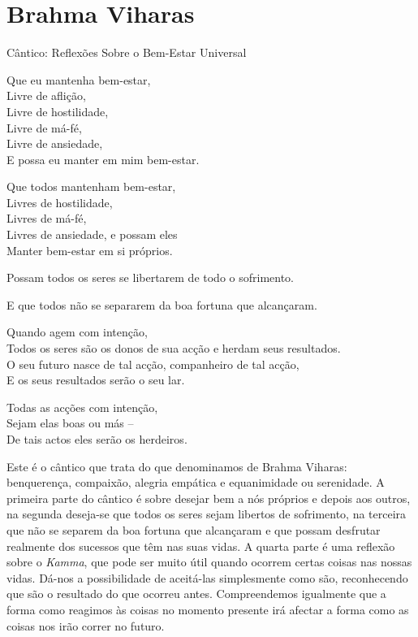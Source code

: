 \chapter{Brahma Viharas}

{\centering\sectionFont\sectionSize
Cântico: Reflexões Sobre o Bem-Estar Universal
\par}

{\itshape
\setlength{\parskip}{0.5\baselineskip}%
\setlength{\parindent}{0pt}%

Que eu mantenha bem-estar,\\
Livre de aflição,\\
Livre de hostilidade,\\
Livre de má-fé,\\
Livre de ansiedade,\\
E possa eu manter em mim bem-estar.

Que todos mantenham bem-estar,\\
Livres de hostilidade,\\
Livres de má-fé,\\
Livres de ansiedade, e possam eles\\
Manter bem-estar em si próprios.

Possam todos os seres se libertarem de todo o sofrimento.

E que todos não se separarem da boa fortuna que alcançaram.

Quando agem com intenção,\\
Todos os seres são os donos de sua acção e herdam seus resultados.\\
O seu futuro nasce de tal acção, companheiro de tal acção,\\
E os seus resultados serão o seu lar.

Todas as acções com intenção,\\
Sejam elas boas ou más --\\
De tais actos eles serão os herdeiros.

}

\bigskip

Este é o cântico que trata do que denominamos de Brahma Viharas:
benquerença, compaixão, alegria empática e equanimidade ou serenidade. A
primeira parte do cântico é sobre desejar bem a nós próprios e depois
aos outros, na segunda deseja-se que todos os seres sejam libertos de
sofrimento, na terceira que não se separem da boa fortuna que alcançaram
e que possam desfrutar realmente dos sucessos que têm nas suas vidas. A
quarta parte é uma reflexão sobre o \emph{Kamma}, que pode ser muito
útil quando ocorrem certas coisas nas nossas vidas. Dá-nos a
possibilidade de aceitá-las simplesmente como são, reconhecendo que são
o resultado do que ocorreu antes. Compreendemos igualmente que a forma
como reagimos às coisas no momento presente irá afectar a forma como as
coisas nos irão correr no futuro.


